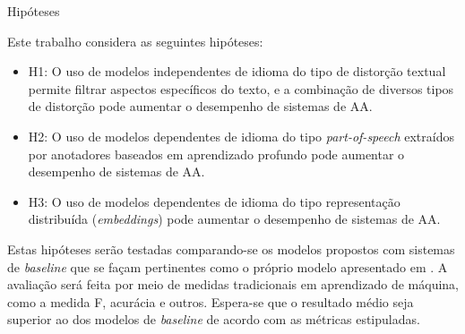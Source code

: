 \begin{frame} {Hipóteses}

Este trabalho considera as seguintes hipóteses:

\begin{itemize}
	\item {H1:} O uso de modelos independentes de idioma do tipo de distorção textual permite filtrar aspectos específicos do texto, e a combinação de diversos tipos de distorção pode aumentar o desempenho de sistemas de AA.
	
	\item {H2:} O uso de modelos dependentes de idioma do tipo {\it part-of-speech} extraídos por anotadores baseados em aprendizado profundo pode aumentar o desempenho de sistemas de AA.
	
	\item {H3:} O uso de modelos dependentes de idioma do tipo representação distribuída ({\it embeddings}) pode aumentar o desempenho de sistemas de AA.
\end{itemize}


Estas hipóteses serão testadas comparando-se os modelos propostos com sistemas de {\it baseline} que se façam pertinentes como o próprio modelo apresentado em .  A avaliação será feita por meio de medidas tradicionais em aprendizado de máquina, como a medida F, acurácia e outros. Espera-se que o resultado médio seja superior ao dos modelos de {\it baseline} de acordo com as métricas estipuladas.
\end{frame}
